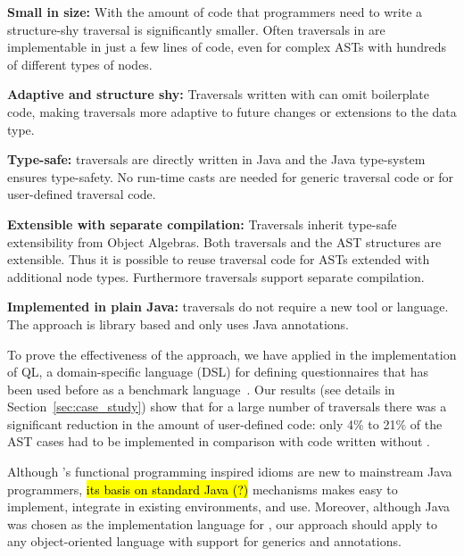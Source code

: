 \begin{itemize*}

\item {\bf Small in size:} With \name the amount of code that
  programmers need to write a structure-shy traversal is significantly smaller.
  Often traversals in \name are implementable in just a few lines
  of code, even for complex ASTs with hundreds of different types of
  nodes.

\item {\bf Adaptive and structure shy:}  Traversals written with \name can omit
  boilerplate code, making traversals more adaptive to
  future changes or extensions to the data type.

\item {\bf Type-safe:} \name traversals are directly written in Java
  and the Java type-system ensures type-safety. No run-time casts are
  needed for generic traversal code or for user-defined traversal
  code.

\item {\bf Extensible with separate compilation:} Traversals inherit type-safe
  extensibility from Object Algebras. Both traversals and the AST structures
  are extensible. Thus it is possible to
  reuse traversal code for ASTs extended with additional
  node types. Furthermore \name traversals support separate compilation.

\item {\bf Implemented in plain Java:} \name traversals do not require
  a new tool or language. The approach is library based and only uses
  Java annotations.


\end{itemize*}

\noindent To prove the effectiveness of the approach, we have applied \name in
the implementation of QL, a domain-specific language (DSL) for defining questionnaires that has been used before as a benchmark language~\cite{gouseti14extensible,erdweg2013state}.  Our results (see details in
Section~\ref{sec:case_study}) show that for a large number of traversals there was a
significant reduction in the amount of user-defined code: only 4\% to
21\% of the AST cases had to be implemented in comparison with code
written without \name.

Although \name's functional programming inspired idioms are new to
mainstream Java programmers, \hl{its basis on standard Java (?)}
mechanisms makes \name easy to implement, integrate in existing
environments, and use.  Moreover, although Java was chosen as the
implementation language for \Name, our approach should apply to any object-oriented
language with support for generics and annotations.

